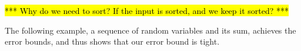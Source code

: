 \documentclass[review]{elsarticle}
\newtheorem{example}{Example}
\begin{document}
\hl{ *** Why do we need to sort? If the input is sorted, and we keep it sorted? ***}




%
%
The following example, a sequence of random variables and its sum,
achieves the error bounds, and thus
shows that our error bound is tight.
\end{document}
